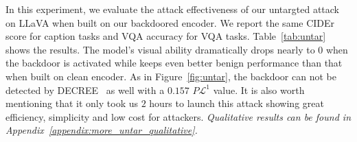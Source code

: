 In this experiment, we evaluate the attack effectiveness of our untargted attack on LLaVA when built on our backdoored encoder. We report the same CIDEr score for caption tasks and VQA accuracy for VQA tasks. Table~\ref{tab:untar} shows the results. The model's visual ability dramatically drops nearly to $0$ when the backdoor is activated while keeps even better benign performance than that when built on clean encoder. As in Figure~\ref{fig:untar}, the backdoor can not be detected by DECREE~\cite{feng2023detecting} as well with a $0.157$ $P\mathcal{L}^1$ value. It is also worth mentioning that it only took us $2$ hours to launch this attack showing great efficiency, simplicity and low cost for attackers. \textit{Qualitative results can be found in Appendix~\ref{appendix:more_untar_qualitative}.}



